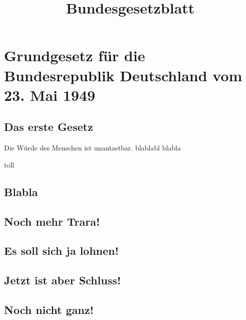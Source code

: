 \documentclass{sasbase}
\begin{document}
\title{Bundesgesetzblatt}

\mytitle

\section{Grundgesetz für die Bundesrepublik Deutschland vom 23. Mai 1949}

\lipsum[1]

\subsection{Das erste Gesetz}

\begin{article}{1}
    \item Die Würde des Menschen ist unantastbar. blablabl
        blabla
    \item toll
\end{article}

\lipsum[2]

\subsection{Blabla}

\lipsum[3]

\subsection{Noch mehr Trara!}

\lipsum[4]

\subsection{Es soll sich ja lohnen!}

\lipsum[5]

\subsection{Jetzt ist aber Schluss!}

\lipsum[6]

\subsection{Noch nicht ganz!}

\lipsum[7]
\end{document}
